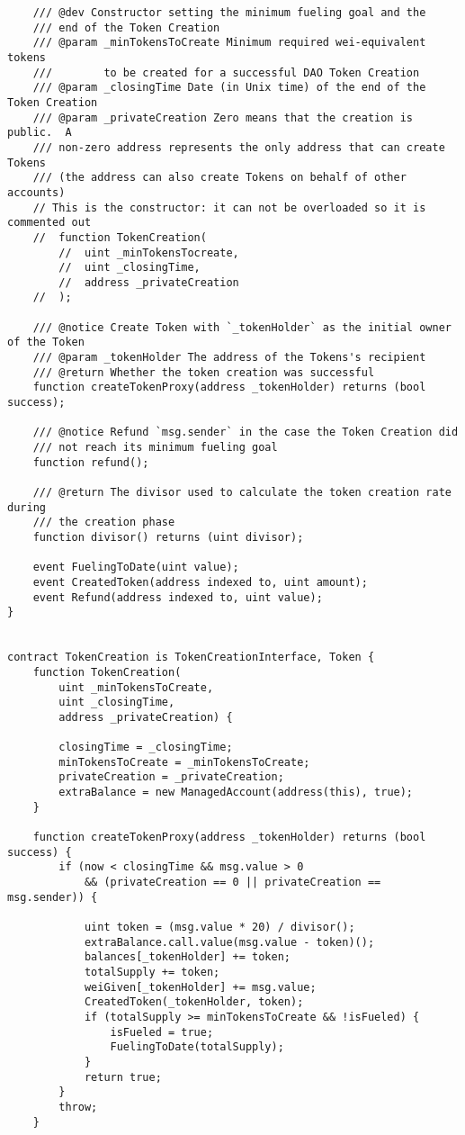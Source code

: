 \documentclass[9pt,oneside]{amsart}
\begin{document}
\begin{appendix}
\begin{verbatim}
    /// @dev Constructor setting the minimum fueling goal and the
    /// end of the Token Creation
    /// @param _minTokensToCreate Minimum required wei-equivalent tokens
    ///        to be created for a successful DAO Token Creation
    /// @param _closingTime Date (in Unix time) of the end of the Token Creation
    /// @param _privateCreation Zero means that the creation is public.  A
    /// non-zero address represents the only address that can create Tokens
    /// (the address can also create Tokens on behalf of other accounts)
    // This is the constructor: it can not be overloaded so it is commented out
    //  function TokenCreation(
        //  uint _minTokensTocreate,
        //  uint _closingTime,
        //  address _privateCreation
    //  );

    /// @notice Create Token with `_tokenHolder` as the initial owner of the Token
    /// @param _tokenHolder The address of the Tokens's recipient
    /// @return Whether the token creation was successful
    function createTokenProxy(address _tokenHolder) returns (bool success);

    /// @notice Refund `msg.sender` in the case the Token Creation did
    /// not reach its minimum fueling goal
    function refund();

    /// @return The divisor used to calculate the token creation rate during
    /// the creation phase
    function divisor() returns (uint divisor);

    event FuelingToDate(uint value);
    event CreatedToken(address indexed to, uint amount);
    event Refund(address indexed to, uint value);
}


contract TokenCreation is TokenCreationInterface, Token {
    function TokenCreation(
        uint _minTokensToCreate,
        uint _closingTime,
        address _privateCreation) {

        closingTime = _closingTime;
        minTokensToCreate = _minTokensToCreate;
        privateCreation = _privateCreation;
        extraBalance = new ManagedAccount(address(this), true);
    }

    function createTokenProxy(address _tokenHolder) returns (bool success) {
        if (now < closingTime && msg.value > 0
            && (privateCreation == 0 || privateCreation == msg.sender)) {

            uint token = (msg.value * 20) / divisor();
            extraBalance.call.value(msg.value - token)();
            balances[_tokenHolder] += token;
            totalSupply += token;
            weiGiven[_tokenHolder] += msg.value;
            CreatedToken(_tokenHolder, token);
            if (totalSupply >= minTokensToCreate && !isFueled) {
                isFueled = true;
                FuelingToDate(totalSupply);
            }
            return true;
        }
        throw;
    }


\end{verbatim}
\end{appendix}
\end{document}
